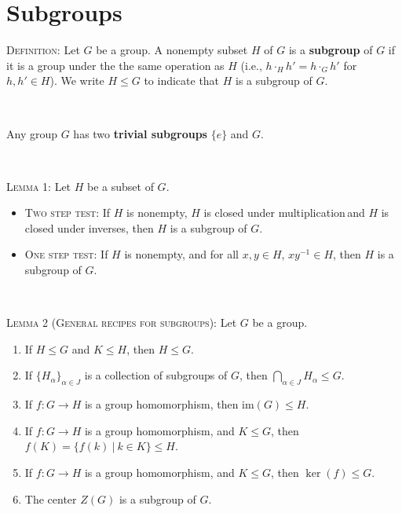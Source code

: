 \documentclass[12pt]{amsart}
\newcommand{\showsol}[1]{\def\displaysol{#1}}
\begin{document}
\showsol{0}
	
	\thispagestyle{empty}
	
	\section*{Subgroups}
	
	

\begin{framed}

\textsc{Definition:} Let $G$ be a group. A nonempty subset $H$ of $G$ is a \textbf{subgroup} of $G$ if it is a group under the the same operation as $H$  (i.e., $h \cdot_H h' = h \cdot_G h'$ for $h,h'\in H$). We write $H\leq G$ to indicate that $H$ is a subgroup of $G$.

\

Any group $G$ has two \textbf{trivial subgroups} $\{e\}$ and $G$.

\

\textsc{Lemma 1:} Let $H$ be a subset of $G$.
\begin{itemize}
\item \textsc{Two step test:} If $H$ is nonempty, $H$ is closed under multiplication\footnotemark\,and $H$ is closed under inverses\footnotemark[1], then $H$ is a subgroup of $G$.
\item \textsc{One step test:} If $H$ is nonempty, and for all $x,y\in H$, $xy^{-1}\in H$, then $H$ is a subgroup of $G$.
\end{itemize}

\

\textsc{Lemma 2 (General recipes for subgroups):} Let $G$ be a group.
\begin{enumerate}
\item If $H\leq  G$ and $K\leq H$, then $H\leq G$.
\item If $\{ H_{\alpha} \}_{\alpha\in J}$ is a collection of subgroups of $G$, then $\bigcap_{\alpha\in J} H_\alpha \leq G$.
\item If $f:G\to H$ is a group homomorphism, then $\mathrm{im}(G) \leq H$.
\item If $f:G\to H$ is a group homomorphism, and $K\leq G$, then $f(K) = \{ f(k) \ | \ k\in K\} \leq H$.
\item If $f:G\to H$ is a group homomorphism, and $K\leq G$, then $\ker(f) \leq G$.
\item The center $Z(G)$ is a subgroup of $G$.
\end{enumerate}


\end{framed}
\end{document}
